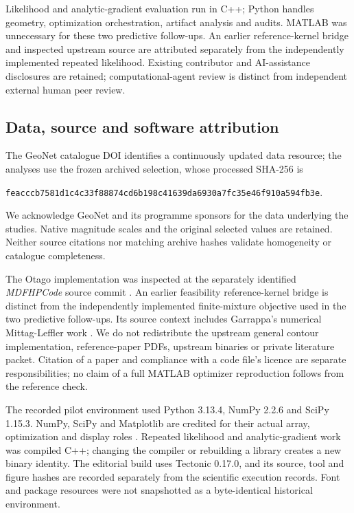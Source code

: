 Likelihood and analytic-gradient evaluation run in C++; Python handles
geometry, optimization orchestration, artifact analysis and audits.
MATLAB was unnecessary for these two predictive follow-ups. An earlier
reference-kernel bridge and inspected upstream source are attributed
separately from the independently implemented repeated likelihood.
Existing contributor and AI-assistance disclosures are retained;
computational-agent review is distinct from independent external
human peer review.



\subsection{Data, source and software attribution}

The GeoNet catalogue DOI identifies a continuously updated data resource;
the analyses use the frozen archived selection, whose processed SHA-256 is
\begin{center}\small
\nolinkurl{feacccb7581d1c4c33f88874cd6b198c41639da6930a7fc35e46f910a594fb3e}.
\end{center}
We acknowledge GeoNet and its programme sponsors for the data underlying
the studies. Native magnitude scales and the original selected values are
retained. Neither source citations nor matching archive hashes validate
homogeneity or catalogue completeness.

The Otago implementation was inspected at the separately identified
\emph{MDFHPCode} source commit \citep{MDFHPCode}. An earlier feasibility
reference-kernel bridge is distinct from the independently implemented
finite-mixture objective used in the two predictive follow-ups. Its source
context includes Garrappa's numerical Mittag-Leffler work
\citep{Garrappa2015}. We do not redistribute the upstream general contour
implementation, reference-paper PDFs, upstream binaries or private
literature packet. Citation of a paper and compliance with a code file's
licence are separate responsibilities; no claim of a full MATLAB optimizer
reproduction follows from the reference check.

The recorded pilot environment used Python 3.13.4, NumPy 2.2.6 and SciPy
1.15.3. NumPy, SciPy and Matplotlib are credited for their actual array,
optimization and display roles \citep{Harris2020,Virtanen2020,Hunter2007}.
Repeated likelihood and analytic-gradient work was compiled C++; changing
the compiler or rebuilding a library creates a new binary identity. The
editorial build uses Tectonic 0.17.0, and its source, tool and figure hashes
are recorded separately from the scientific execution records. Font and
package resources were not snapshotted as a byte-identical historical
environment.

